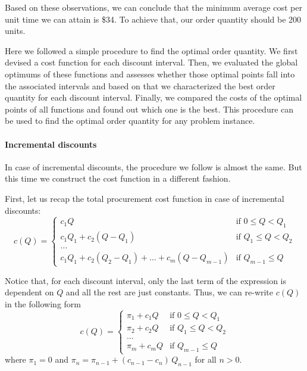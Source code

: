 \begin{solution}
Based on these observations, we can conclude that the minimum average cost per unit time we can attain is \$34. To achieve that, our order quantity should be 200 units.

Here we followed a simple procedure to find the optimal order quantity. We first devised a cost function for each discount interval. Then, we evaluated the global optimums of these functions and assesses whether those optimal points fall into the associated intervals and based on that we characterized the best order quantity for each discount interval. Finally, we compared the costs of the optimal points of all functions and found out which one is the best. This procedure can be used to find the optimal order quantity for any problem instance. 

\paragraph{Incremental discounts}

In case of incremental discounts, the procedure we follow is almost the same. But this time we construct the cost function in a different fashion.

First, let us recap the total procurement cost function in case of incremental discounts:
\begin{equation*}
c(Q) = 
\begin{cases}
c_1 Q & \text{if } 0 \leq Q < Q_1 \\
c_1 Q_1 + c_2(Q - Q_1) & \text{if } Q_1 \leq Q < Q_2 \\
\ldots \\
c_1 Q_1 + c_2(Q_2 - Q_1) + \ldots + c_m(Q - Q_{m-1}) & \text{if } Q_{m-1} \leq Q 
\end{cases}
\end{equation*}

Notice that, for each discount interval, only the last term of the expression is dependent on $Q$ and all the rest are just constants. Thus, we can re-write $c(Q)$ in the following form
\begin{equation*}
c(Q) = 
\begin{cases}
\pi_1 + c_1 Q & \text{if } 0 \leq Q < Q_1 \\
\pi_2 + c_2 Q & \text{if } Q_1 \leq Q < Q_2 \\
\ldots \\
\pi_m + c_m Q & \text{if } Q_{m-1} \leq Q 
\end{cases}
\end{equation*}
where $\pi_1=0$ and $\pi_n=\pi_{n-1}+(c_{n-1}-c_n)\,Q_{n-1}$ for all $n>0$.


\end{solution}
